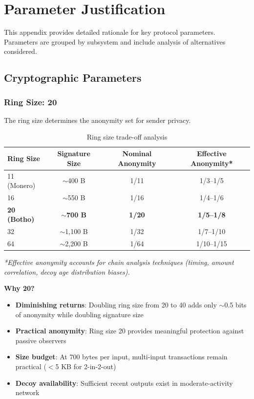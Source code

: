 
\section{Parameter Justification}
\label{sec:parameters}

This appendix provides detailed rationale for key protocol parameters.
Parameters are grouped by subsystem and include analysis of alternatives
considered.

\subsection{Cryptographic Parameters}

\subsubsection{Ring Size: 20}

The ring size determines the anonymity set for sender privacy.

\begin{table}[h]
\centering
\caption{Ring size trade-off analysis}
\label{tab:ring-size}
\begin{tabular}{@{}lccc@{}}
\toprule
\textbf{Ring Size} & \textbf{Signature Size} & \textbf{Nominal Anonymity} & \textbf{Effective Anonymity*} \\
\midrule
11 (Monero) & $\sim$400 B & 1/11 & 1/3--1/5 \\
16 & $\sim$550 B & 1/16 & 1/4--1/6 \\
\textbf{20 (Botho)} & \textbf{$\sim$700 B} & \textbf{1/20} & \textbf{1/5--1/8} \\
32 & $\sim$1,100 B & 1/32 & 1/7--1/10 \\
64 & $\sim$2,200 B & 1/64 & 1/10--1/15 \\
\bottomrule
\end{tabular}
\end{table}

\textit{*Effective anonymity accounts for chain analysis techniques (timing,
amount correlation, decoy age distribution biases).}

\textbf{Why 20?}
\begin{itemize}
  \item \textbf{Diminishing returns}: Doubling ring size from 20 to 40 adds
    only $\sim$0.5 bits of anonymity while doubling signature size
  \item \textbf{Practical anonymity}: Ring size 20 provides meaningful
    protection against passive observers
  \item \textbf{Size budget}: At 700 bytes per input, multi-input transactions
    remain practical ($<$5 KB for 2-in-2-out)
  \item \textbf{Decoy availability}: Sufficient recent outputs exist in
    moderate-activity network
\end{itemize}

